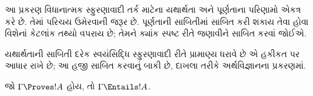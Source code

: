 \label{guunit:OLP-0503}


\begin{editorial}
  આ પ્રકરણ વિધાનાત્મક સ્ફુરણાવાદી તર્ક માટેના યથાર્થતા
  અને પૂર્ણતાના પરિણામો એકત્ર કરે છે. તેમાં પરિચય ઉમેરવાની
  જરૂર છે. પૂર્ણતાની સાબિતીમાં સાબિત કરી શકાય તેવા હોવા
  વિશેનાં કેટલાંક તથ્યો વપરાય છે; તેમને ક્યાંક સ્પષ્ટ રીતે
  જણાવીને સાબિત કરવાં જોઈએ.
\end{editorial}

\begingroup
\makeatletter{}\makeatother


\label{guunit:OLP-0504}


\begin{editorial}
  યથાર્થતાની સાબિતી દરેક સ્વયંસિદ્ધિ સ્ફુરણાવાદી રીતે
  પ્રામાણ્ય ધરાવે છે એ હકીકત પર આધાર રાખે છે; આ હજી
  સાબિત કરવાનું બાકી છે, દાખલા તરીકે અર્થવિજ્ઞાનના પ્રકરણમાં.
\end{editorial}



\begin{thm}[યથાર્થતા]
  જો $\Gamma \Proves !A$ હોય, તો $ \Gamma \Entails !A$.
\end{thm}

